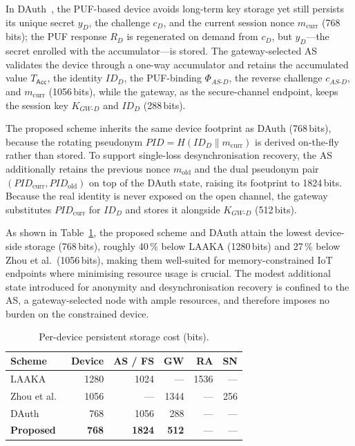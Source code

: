 \documentclass[conference]{IEEEtran}
\begin{document}
In DAuth~\cite{das2026comsnets}, the PUF-based device avoids long-term key storage
yet still persists its unique secret $y_D$, the challenge $c_D$, and the current
session nonce $m_{\mathrm{curr}}$ (768\,bits); the PUF response $R_D$ is regenerated
on demand from $c_D$, but $y_D$---the secret enrolled with the accumulator---is
stored. The gateway-selected AS validates the device through a one-way accumulator
and retains the accumulated value $T_{\mathsf{Acc}}$, the identity $ID_D$, the
PUF-binding $\Phi_{AS\text{-}D}$, the reverse challenge $c_{AS\text{-}D}$, and
$m_{\mathrm{curr}}$ (1056\,bits), while the gateway, as the secure-channel endpoint,
keeps the session key $K_{GW\text{-}D}$ and $ID_D$ (288\,bits).

The proposed scheme inherits the same device footprint as DAuth (768\,bits),
because the rotating pseudonym $\mathit{PID} = H(ID_D \| m_{\mathrm{curr}})$ is
derived on-the-fly rather than stored. To support single-loss desynchronisation
recovery, the AS additionally retains the previous nonce $m_{\mathrm{old}}$ and the
dual pseudonym pair $(\mathit{PID}_{\mathrm{curr}}, \mathit{PID}_{\mathrm{old}})$ on
top of the DAuth state, raising its footprint to 1824\,bits. Because the real
identity is never exposed on the open channel, the gateway substitutes
$\mathit{PID}_{\mathrm{curr}}$ for $ID_D$ and stores it alongside $K_{GW\text{-}D}$
(512\,bits).

As shown in Table~\ref{tab:storage}, the proposed scheme and DAuth attain the
lowest device-side storage (768\,bits), roughly 40\,\% below LAAKA (1280\,bits)
and 27\,\% below Zhou et al.\ (1056\,bits), making them well-suited for
memory-constrained IoT endpoints where minimising resource usage is crucial. The
modest additional state introduced for anonymity and desynchronisation recovery is
confined to the AS, a gateway-selected node with ample resources, and therefore
imposes no burden on the constrained device.

\begin{table}[!t]
  \centering
  \caption{Per-device persistent storage cost (bits). }
  \label{tab:storage}
  \setlength{\tabcolsep}{4pt}
  \begin{tabular}{@{}lrrrrr@{}}
    \toprule
    Scheme & Device & AS / FS & GW & RA & SN \\
    \midrule
    LAAKA~\cite{ali2024laaka}       & 1280 & 1024 & ---  & 1536 & ---  \\
    Zhou et al.~\cite{zhou2024auth}  & 1056 & ---  & 1344 & --- & 256  \\
    DAuth~\cite{das2026comsnets}     & 768  & 1056 & 288  & --- & ---  \\
    \textbf{Proposed}               & \textbf{768} & \textbf{1824} & \textbf{512} & --- & --- \\
    \bottomrule
  \end{tabular}
\end{table}
\end{document}
